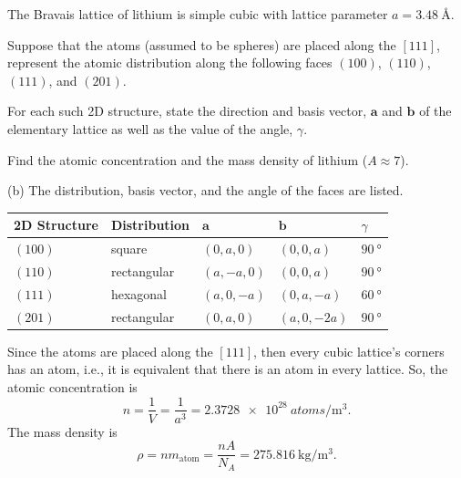 \begin{problem}
  The Bravais lattice of lithium is simple cubic with lattice parameter
  $a = \qty{3.48}\angstrom$.
  \begin{enumext}
    \item Suppose that the atoms (assumed to be spheres) are placed along the
    $[111]$, represent the atomic distribution along the following faces
    $(100)$, $(110)$, $(111)$, and $(201)$.
    \item For each such 2D structure, state the direction and basis vector,
    $\bm a$ and $\bm b$ of the elementary lattice as well as the value of the
    angle, $\gamma$.
    \item Find the atomic concentration and the mass density of lithium
    ($A \approx 7$).
  \end{enumext}
\end{problem}
\begin{solution}\leavevmode
  \begin{enumext}
    \item (b)\quad
    The distribution, basis vector, and the angle of the faces are listed.
    \begin{center}
      \begin{tabular}{*5l}
        \toprule
        2D Structure & Distribution & $\bm a$ & $\bm b$ & $\gamma$\\
        \midrule
        $(100)$ & square      & $(0, a, 0)$   & $(0, 0, a)$ &
        $\qty{90}\degree$\\
        $(110)$ & rectangular & $(a, -a, 0)$  & $(0, 0, a)$ &
        $\qty{90}\degree$\\
        $(111)$ & hexagonal   & $(a, 0, -a)$  & $(0, a, -a)$ &
        $\qty{60}\degree$\\
        $(201)$ & rectangular & $(0, a, 0)$   & $(a, 0, -2a)$ &
        $\qty{90}\degree$\\
        \bottomrule
      \end{tabular}
    \end{center}
    \addtocounter{enumXi}{1}
    \item Since the atoms are placed along the $[111]$, then every cubic
    lattice's corners has an atom, i.e., it is equivalent that there is an
    atom in every lattice. So, the atomic concentration is
    \[
      n = \frac1V = \frac1{a^3} = \qty{2.3728e28}{atoms/\m^3}.
    \]
    The mass density is
    \[
      \rho = n m_\text{atom} = \frac{nA}{N_A} = \qty{275.816}{\kg/\m^3}.
    \]
  \end{enumext}
\end{solution}